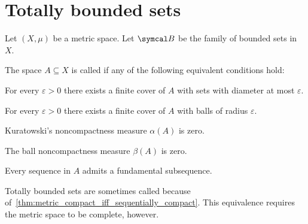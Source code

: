 \section{Totally bounded sets}\label{sec:totally_bounded_sets}

Let $(X, \mu)$ be a metric space. Let $\Cal{B}$ be the family of bounded sets in $X$.

\begin{definition}\label{def:totally_bounded_set}
  The space $A \subseteq X$ is called  if any of the following equivalent conditions hold:

  \begin{defenum}
    \item\label{def:totally_bounded_set/sets} For every $\varepsilon > 0$ there exists a finite cover of $A$ with sets with diameter at most $\varepsilon$.
    \item\label{def:totally_bounded_set/balls} For every $\varepsilon > 0$ there exists a finite cover of $A$ with balls of radius $\varepsilon$.
    \item\label{def:totally_bounded_set/zero_noncompactness/sets} Kuratowski's noncompactness measure $\alpha(A)$ is zero.
    \item\label{def:totally_bounded_set/zero_noncompactness/balls} The ball noncompactness measure $\beta(A)$ is zero.
    \item\label{def:totally_bounded_set/fundamental_subsequences} Every sequence in $A$ admits a fundamental subsequence.
  \end{defenum}

  Totally bounded sets are sometimes called  because of~\cref{thm:metric_compact_iff_sequentially_compact}. This equivalence requires the metric space to be complete, however.
\end{definition}

